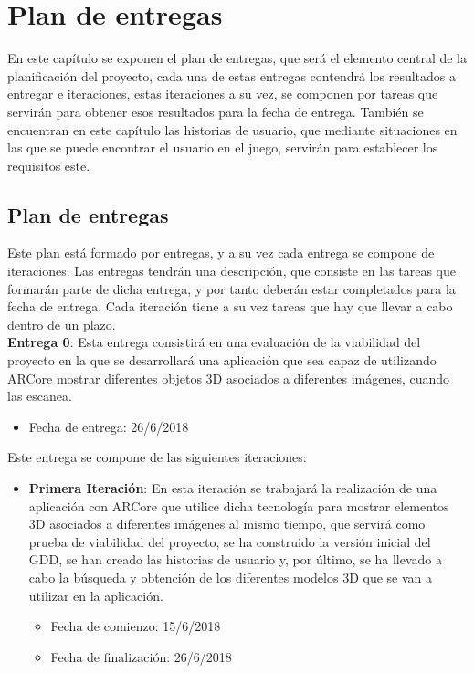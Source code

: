 \chapter{Plan de entregas}
\label{ch:plan}
En este capítulo se exponen el plan de entregas, que será el elemento central de la planificación del proyecto, cada una de estas entregas contendrá los resultados a entregar e iteraciones, estas iteraciones a su vez, se componen por tareas que servirán para obtener esos resultados para la fecha de entrega. También se encuentran en este capítulo las historias de usuario, que mediante situaciones en las que se puede encontrar el usuario en el juego, servirán para establecer los requisitos este.


\section{Plan de entregas}
Este plan está formado por entregas, y a su vez cada entrega se compone de iteraciones. Las entregas tendrán una descripción, que consiste en las tareas que formarán parte de dicha entrega, y por tanto deberán estar completados para la fecha de entrega. Cada iteración tiene a su vez tareas que hay que llevar a cabo dentro de un plazo.\\

\textbf{Entrega 0}: Esta entrega consistirá en una evaluación de la viabilidad del proyecto en la que se desarrollará una aplicación que sea capaz de utilizando ARCore mostrar diferentes objetos 3D asociados a diferentes imágenes, cuando las escanea.

\begin{itemize}
  \item Fecha de entrega: 26/6/2018
\end{itemize}

\hfill

Este entrega se compone de las siguientes iteraciones:

\begin{itemize}
  \item \textbf{Primera Iteración}: En esta iteración se trabajará la realización de una aplicación con ARCore que utilice dicha tecnología para mostrar elementos 3D asociados a diferentes imágenes al mismo tiempo, que servirá como prueba de viabilidad del proyecto, se ha construido la versión inicial del GDD, se han creado las historias de usuario y, por último, se ha llevado a cabo la búsqueda y obtención de los diferentes modelos 3D que se van a utilizar en la aplicación.

  \begin{itemize}
    \item Fecha de comienzo: 15/6/2018
    \item Fecha de finalización: 26/6/2018
  \end{itemize}

\end{itemize}

